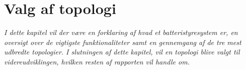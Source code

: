 \chapter{Valg af topologi}\label{kap:topologi}

\emph{I dette kapitel vil der være en forklaring af hvad et batteristyresystem er, en oversigt over de vigtigste funktionaliteter samt en gennemgang af de tre mest udbredte topologier. I slutningen af dette kapitel, vil en topologi blive valgt til videreudviklingen, hvilken resten af rapporten vil handle om.}